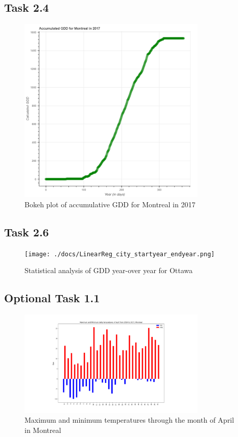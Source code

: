 \documentclass[12pt]{article}
\begin{document}
\subsection{Task 2.4}
\begin{figure}[!htbp]
\centering
\includegraphics[width=0.8\textwidth]{./docs/bokeh_plot.png} 
\caption{\scriptsize Bokeh plot of accumulative GDD for Montreal in 2017}
\label{bokeh}		  
\end{figure}

\pagebreak
\subsection{Task 2.6}
\begin{figure}[!htbp]
\centering
\texttt{[image: ./docs/LinearReg\_city\_startyear\_endyear.png]} 
\caption{\scriptsize Statistical analysis of GDD year-over year for Ottawa}
\label{GDDregression}		  
\end{figure}

\pagebreak


\subsection{Optional Task 1.1}
\begin{figure}[!htbp]
\centering
\includegraphics[width=0.8\textwidth]{./docs/aprildaily.png} 
\caption{\scriptsize Maximum and minimum temperatures through the month of April in Montreal}
\label{Aprilmaxmin}		  
\end{figure}
\end{document}
